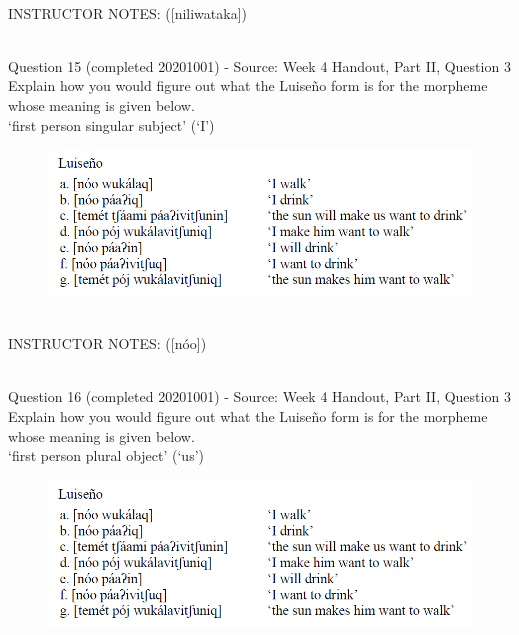 \documentclass[12pt]{article}
\begin{document}
~\\
INSTRUCTOR NOTES: ([niliwataka])


~\\

{\large Question 15} (completed 20201001) - Source: Week 4 Handout, Part II, Question 3\\

Explain how you would figure out what the Luiseño form is for the morpheme whose meaning is given below.\\

‘first person singular subject’ (‘I’)

\begin{figure}[H]
\includegraphics{../images/luiseno.png}
\end{figure}

~\\
INSTRUCTOR NOTES: ([nóo])


~\\

{\large Question 16} (completed 20201001) - Source: Week 4 Handout, Part II, Question 3\\

Explain how you would figure out what the Luiseño form is for the morpheme whose meaning is given below.\\

‘first person plural object’ (‘us’)

\begin{figure}[H]
\includegraphics{../images/luiseno.png}
\end{figure}
\end{document}
